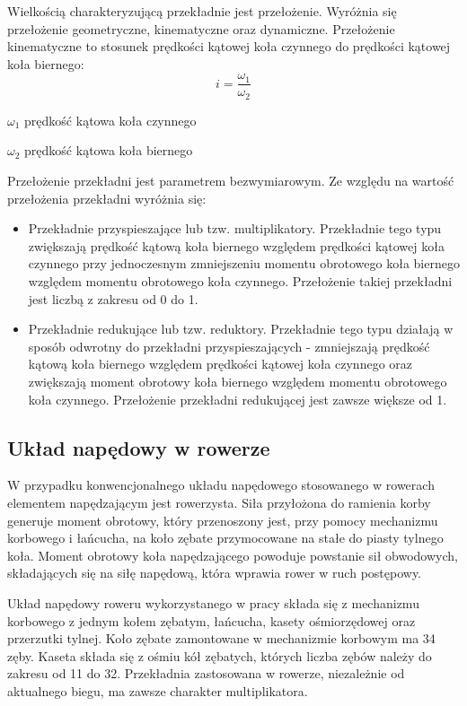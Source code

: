 Wielkością charakteryzującą przekładnie jest przełożenie. Wyróżnia się przełożenie geometryczne, kinematyczne oraz dynamiczne. Przełożenie kinematyczne to stosunek prędkości kątowej koła czynnego do prędkości kątowej koła biernego\cite{przekladnie}:
\begin{equation}
    i = \frac{\omega_1}{\omega_2}
    \label{eq:przelozenieKinematyczne}
\end{equation}
\begin{eqwhere}[2cm]
	\item[$\omega_1$] prędkość kątowa koła czynnego
	\item[$\omega_2$] prędkość kątowa koła biernego
\end{eqwhere}

Przełożenie przekładni jest parametrem bezwymiarowym. Ze względu na wartość przełożenia przekładni wyróżnia się:
\begin{itemize}
\item
Przekładnie przyspieszające lub tzw. multiplikatory. Przekładnie tego typu zwiększają prędkość kątową koła biernego względem prędkości kątowej koła czynnego przy jednoczesnym zmniejszeniu momentu obrotowego koła biernego względem momentu obrotowego koła czynnego. Przełożenie takiej przekładni jest liczbą z zakresu od 0 do 1.
\item
Przekładnie redukujące lub tzw. reduktory. Przekładnie tego typu działają w sposób odwrotny do przekładni przyspieszających - zmniejszają prędkość kątową koła biernego względem prędkości kątowej koła czynnego oraz zwiększają moment obrotowy koła biernego względem momentu obrotowego koła czynnego. Przełożenie przekładni redukującej jest zawsze większe od 1.
\end{itemize} 
\subsection{Układ napędowy w rowerze}
W przypadku konwencjonalnego układu napędowego stosowanego w rowerach elementem napędzającym jest rowerzysta. Siła przyłożona do ramienia korby generuje moment obrotowy, który przenoszony jest, przy pomocy mechanizmu korbowego i łańcucha, na koło zębate przymocowane na stałe do piasty tylnego koła. Moment obrotowy koła napędzającego powoduje powstanie sił obwodowych, składających się na siłę napędową, która wprawia rower w ruch postępowy.

Układ napędowy roweru wykorzystanego w pracy składa się z mechanizmu korbowego z jednym kołem zębatym, łańcucha, kasety ośmiorzędowej oraz przerzutki tylnej. Koło zębate zamontowane w mechanizmie korbowym ma 34 zęby. Kaseta składa się z ośmiu kół zębatych, których liczba zębów należy do zakresu od 11 do 32. Przekładnia zastosowana w rowerze, niezależnie od aktualnego biegu, ma zawsze charakter multiplikatora.

